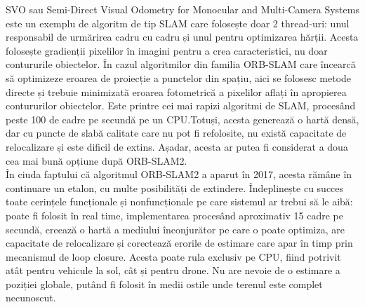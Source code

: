 \documentclass[12pt,a4paper]{report}
\begin{document}
SVO sau Semi-Direct Visual Odometry for Monocular and Multi-Camera Systems este un exemplu 
de algoritm de tip SLAM care folosește doar 2 thread-uri: unul responsabil de 
urmărirea cadru cu cadru și unul pentru optimizarea hărții. Acesta folosește gradienții
pixelilor în imagini pentru a crea caracteristici, nu doar contururile obiectelor. În cazul
algoritmilor din familia ORB-SLAM care încearcă să optimizeze eroarea de proiecție a punctelor
din spațiu, aici se folosesc metode directe și trebuie minimizată eroarea fotometrică a 
pixelilor aflați în apropierea contururilor obiectelor. Este printre cei mai rapizi algoritmi
de SLAM, procesând peste 100 de cadre pe secundă pe un CPU.\@ Totuși, acesta generează o hartă densă, dar cu 
puncte de slabă calitate care nu pot fi refolosite, nu există capacitate de relocalizare și 
este dificil de extins. Așadar, acesta ar putea fi considerat a doua cea mai bună opțiune după ORB-SLAM2.\\

În ciuda faptului că algoritmul ORB-SLAM2 a aparut în 2017, acesta rămâne în continuare 
un etalon, cu multe posibilități de extindere. Îndeplinește cu succes toate cerințele funcționale 
și nonfuncționale pe care sistemul ar trebui să le aibă: poate fi folosit în real time,
implementarea procesând aproximativ 15 cadre pe secundă, creează o hartă a mediului înconjurător
pe care o poate optimiza, are capacitate de relocalizare și corectează erorile de estimare
care apar în timp prin mecanismul de loop closure. Acesta poate rula exclusiv pe CPU, fiind
potrivit atât pentru vehicule la sol, cât și pentru drone. Nu are nevoie de o estimare a poziției
globale, putând fi folosit în medii ostile unde terenul este complet necunoscut.  

\end{document}
